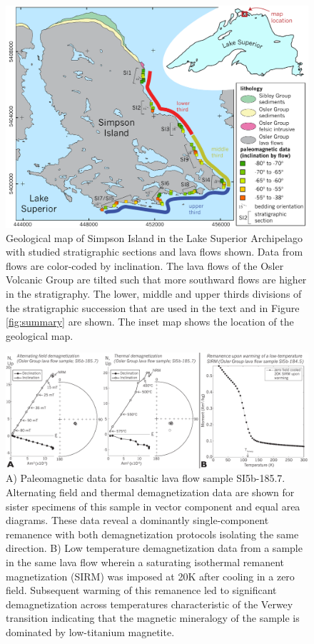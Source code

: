 \documentclass[draft,gc]{AGUTeX}
\begin{document}
\begin{figure}
\noindent\includegraphics[width=\textwidth]{2014_Osler_Figures/Simpson_Island_Map.pdf}
\caption{Geological map of Simpson Island in the Lake Superior Archipelago with studied stratigraphic sections and lava flows shown. Data from flows are color-coded by inclination. The lava flows of the Osler Volcanic Group are tilted such that more southward flows are higher in the stratigraphy. The lower, middle and upper thirds divisions of the stratigraphic succession that are used in the text and in Figure \ref{fig:summary} are shown. The inset map shows the location of the geological map.}
\label{fig:map}
\end{figure}

\begin{figure}
\noindent\includegraphics[width=\textwidth]{2014_Osler_Figures/PmagRockmag.pdf}
\caption{A) Paleomagnetic data for basaltic lava flow sample SI5b-185.7. Alternating field and thermal demagnetization data are shown for sister specimens of this sample in vector component and equal area diagrams. These data reveal a dominantly single-component remanence with both demagnetization protocols isolating the same direction. B) Low temperature demagnetization data from a sample in the same lava flow wherein a saturating isothermal remanent magnetization (SIRM) was imposed at 20K after cooling in a zero field. Subsequent warming of this remanence led to significant demagnetization across temperatures characteristic of the Verwey transition indicating that the magnetic mineralogy of the sample is dominated by low-titanium magnetite.}
\label{fig:pmagrockmag}
\end{figure}
\end{document}
